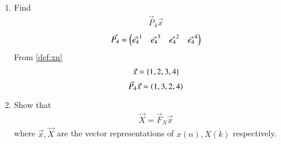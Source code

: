 \documentclass[journal,12pt,twocolumn]{IEEEtran}
\renewcommand\thesection{\arabic{section}}
\begin{document}
\begin{enumerate}[label=\thesection.\arabic*
	,ref=\thesection.\theenumi]
\begin{enumerate}[label=\arabic*.,ref=\thesection.\theenumi]
\begin{align}
	\myvec{\vec{D}_{N/2}\vec{F}_{N/2} \\ -\vec{D}_{N/2}\vec{F}_{N/2}} = \myvec{\vec{f}_N^{2} & \vec{f}_N^{4} & \ldots & \vec{f}_N^{N}}
\end{align}
and
\begin{align}
	\myvec{\vec{I}_{N/2}\vec{F}_{N/2} \\ \vec{I}_{N/2}\vec{F}_{N/2}} = \myvec{\vec{f}_N^{1} & \vec{f}_N^{3} & \ldots & \vec{f}_N^{N - 1}}
\end{align}
Thus,
\begin{align}
	&\myvec{\vec{I}_2\vec{F}_2 & \vec{D}_2\vec{F}_2 \\ \vec{I}_2\vec{F}_2 & -\vec{D}_2\vec{F}_2} = \myvec{\vec{I}_{N/2} & \vec{D}_{N/2} \\ \vec{I}_{N/2} & -\vec{D}_{N/2}}\myvec{\vec{F}_{N/2} & 0 \\ 0 & \vec{F}_{N/2}} \nonumber \\
	&= \myvec{\vec{f}_N^{1} & \ldots & \vec{f}_N^{N - 1} & \vec{f}_N^{2} & \ldots & \vec{f}_N^{N}}
\end{align}
and so,
\begin{align}
	&\myvec{\vec{I}_{N/2} & \vec{D}_{N/2} \\ \vec{I}_{N/2} & -\vec{D}_{N/2}}\myvec{\vec{F}_{N/2} & 0 \\ 0 & \vec{F}_{N/2}}\vec{P}_{N} \nonumber \\
	&= \myvec{\vec{f}_N^{1} & \vec{f}_N^{2} & \ldots & \vec{f}_N^{N}} = \vec{F}_N
\end{align}
	\item Find 
	\begin{align}
		\vec{P}_4 \vec{x}
	\end{align}
	\solution
	\begin{equation}
		\vec{P_4} = \begin{pmatrix}\vec{e_4}^{1} & \vec{e_4}^{3} & \vec{e_4}^{2} & \vec{e_4}^{4}\end{pmatrix}
	\end{equation}
	From \eqref{def:xn}
	\begin{equation}
		\vec{x} = \left\{1,2,3,4\right\}
	\end{equation}
	\begin{equation}
		\vec{P}_{4}\vec{x} = \left(1,3,2,4\right)
	\end{equation}
	\item Show that 
	\begin{align}
		\vec{X} = \vec{F}_N \vec{x}
		\label{eq:dft-mat-def}
	\end{align}
	where $\vec{x}, \vec{X}$ are the vector representations of $x(n), X(k)$ respectively.\\

\end{enumerate}
\end{enumerate}
\end{document}
